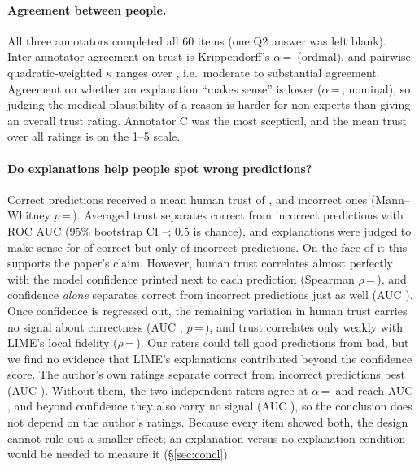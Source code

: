 \paragraph{Agreement between people.} All three annotators completed all 60 items (one Q2 answer was left blank). Inter-annotator agreement on trust is Krippendorff's $\alpha$\,=\,\AlphaTrust{} (ordinal), and pairwise quadratic-weighted $\kappa$ ranges over \PairQWKRange{}, i.e.\ moderate to substantial agreement. Agreement on whether an explanation ``makes sense'' is lower ($\alpha$\,=\,\AlphaSense{}, nominal), so judging the medical plausibility of a reason is harder for non-experts than giving an overall trust rating. Annotator C was the most sceptical, and the mean trust over all ratings is \MeanTrustHuman{} on the 1--5 scale.

\paragraph{Do explanations help people spot wrong predictions?} Correct predictions received a mean human trust of \TrustCorrect{}, and incorrect ones \TrustIncorrect{} (Mann--Whitney $p$\,=\,\PTrustMW{}). Averaged trust separates correct from incorrect predictions with ROC AUC \AUCHuman{} (95\% bootstrap CI \AUCLo{}--\AUCHi{}; 0.5 is chance), and explanations were judged to make sense for \SenseCorrect{} of correct but only \SenseIncorrect{} of incorrect predictions. On the face of it this supports the paper's claim. However, human trust correlates almost perfectly with the model confidence printed next to each prediction (Spearman $\rho$\,=\,\RhoHumanConf{}), and confidence \emph{alone} separates correct from incorrect predictions just as well (AUC \AUCConf{}). Once confidence is regressed out, the remaining variation in human trust carries no signal about correctness (AUC \AUCResid{}, $p$\,=\,\PResid{}), and trust correlates only weakly with LIME's local fidelity ($\rho$\,=\,\RhoHumanRtwo{}). Our raters could tell good predictions from bad, but we find no evidence that LIME's explanations contributed beyond the confidence score. The author's own ratings separate correct from incorrect predictions best (AUC \AUCAuthor{}). Without them, the two independent raters agree at $\alpha$\,=\,\AlphaNoAuthor{} and reach AUC \AUCNoAuthor{}, and beyond confidence they also carry no signal (AUC \AUCResidNoAuthor{}), so the conclusion does not depend on the author's ratings. Because every item showed both, the design cannot rule out a smaller effect; an explanation-versus-no-explanation condition would be needed to measure it (\S\ref{sec:concl}).


